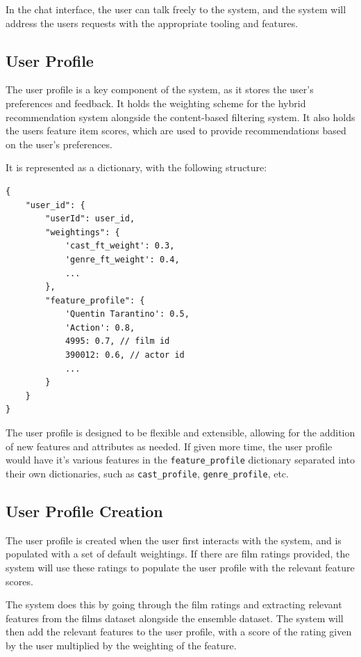 In the chat interface, the user can talk freely to the system, and the system will address the users requests with the appropriate tooling and features.

\subsection{User Profile}
\label{subsec:user_profile}
The user profile is a key component of the system, as it stores the user's preferences and feedback.
It holds the weighting scheme for the hybrid recommendation system alongside the content-based filtering system. 
It also holds the users feature item scores, which are used to provide recommendations based on the user's preferences.

It is represented as a dictionary, with the following structure:
\begin{verbatim}
{
    "user_id": {
        "userId": user_id,
        "weightings": {
            'cast_ft_weight': 0.3, 
            'genre_ft_weight': 0.4, 
            ...
        },
        "feature_profile": {
            'Quentin Tarantino': 0.5,
            'Action': 0.8,
            4995: 0.7, // film id
            390012: 0.6, // actor id
            ...
        }
    }
}
\end{verbatim}

The user profile is designed to be flexible and extensible, allowing for the addition of new features and attributes as needed.
If given more time, the user profile would have it's various features in the \texttt{feature\_profile} dictionary separated into their own dictionaries, such as \texttt{cast\_profile}, \texttt{genre\_profile}, etc.

\subsection{User Profile Creation}
\label{subsec:user_profile_creation}
The user profile is created when the user first interacts with the system, and is populated with a set of default weightings.
If there are film ratings provided, the system will use these ratings to populate the user profile with the relevant feature scores.

The system does this by going through the film ratings and extracting relevant features from the films dataset alongside the ensemble dataset.
The system will then add the relevant features to the user profile, with a score of the rating given by the user multiplied by the weighting of the feature.

